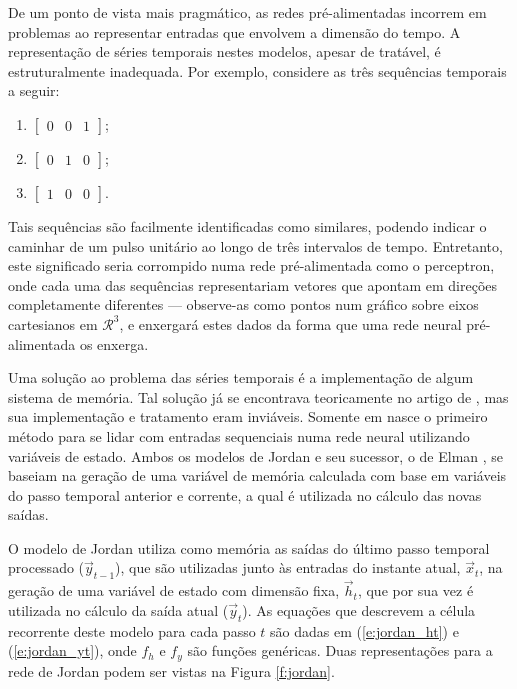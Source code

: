       De um ponto de vista mais pragmático, as redes pré-alimentadas incorrem em problemas ao representar entradas que envolvem a dimensão do tempo. A representação de séries temporais nestes modelos, apesar de tratável, é estruturalmente inadequada. Por exemplo, considere as três sequências temporais a seguir:

      \begin{enumerate} \centering
        \item $\begin{bmatrix} 0 & 0 & 1 \end{bmatrix}$;
        \item $\begin{bmatrix} 0 & 1 & 0 \end{bmatrix}$;
        \item $\begin{bmatrix} 1 & 0 & 0 \end{bmatrix}$.
      \end{enumerate}

      \noindent Tais sequências são facilmente identificadas como similares, podendo indicar o caminhar de um pulso unitário ao longo de três intervalos de tempo. Entretanto, este significado seria corrompido numa rede pré-alimentada como o perceptron, onde cada uma das sequências representariam vetores que apontam em direções completamente diferentes --- observe-as como pontos num gráfico sobre eixos cartesianos em $\mathcal{R}^3$, e enxergará estes dados da forma que uma rede neural pré-alimentada os enxerga.

      Uma solução ao problema das séries temporais é a implementação de algum sistema de memória. Tal solução já se encontrava teoricamente no artigo de , mas sua implementação e tratamento eram inviáveis. Somente em  nasce o primeiro método para se lidar com entradas sequenciais numa rede neural utilizando variáveis de estado. Ambos os modelos de Jordan \citeyear{jordan1986serial} e seu sucessor, o de Elman \citeyear{elman1990finding}, se baseiam na geração de uma variável de memória calculada com base em variáveis do passo temporal anterior e corrente, a qual é utilizada no cálculo das novas saídas.

      O modelo de Jordan utiliza como memória as saídas do último passo temporal processado ($\vec{y}_{t-1}$), que são utilizadas junto às entradas do instante atual, $\vec{x}_t$, na geração de uma variável de estado com dimensão fixa, $\vec{h}_t$, que por sua vez é utilizada no cálculo da saída atual ($\vec{y}_t$). As equações que descrevem a célula recorrente deste modelo para cada passo $t$ são dadas em (\ref{e:jordan_ht}) e (\ref{e:jordan_yt}), onde $f_h$ e $f_y$ são funções genéricas. Duas representações para a rede de Jordan podem ser vistas na Figura \ref{f:jordan}.

